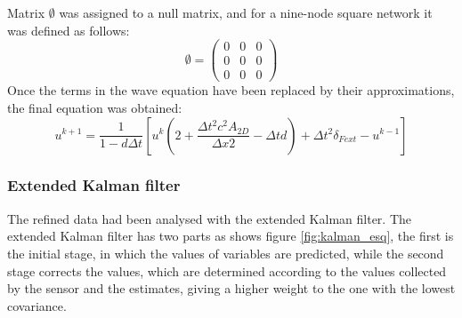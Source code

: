 \documentclass[12pt, a4paper]{article} %
\begin{document}
Matrix $\emptyset$ was assigned to a null matrix, and for a nine-node square network it was defined as follows:
\begin{equation} \label{eqn:matrixI}
    \emptyset = 
        \begin{pmatrix}
            0 & 0 & 0\\
            0 & 0 & 0\\
            0 & 0 & 0
    \end{pmatrix}
\end{equation}
Once the terms in the wave equation have been replaced by their approximations, the final equation was obtained:
\begin{equation} \label{eqn:uk+1}
   u^{k + 1} = \frac{1}{1 - d\Delta t} \left[u^{k} \left(2+ \frac{\Delta t^{2} c^{2} A_{2D}}{\Delta x{2}} - \Delta t d\right) + \Delta t^{2} \delta_{Fext} - u^{k - 1}\right]
\end{equation}
\setlength{\parskip}{0mm}
\subsubsection{Extended Kalman filter}

The refined data had been analysed with the extended Kalman filter. The extended Kalman filter has two parts as shows figure \ref{fig:kalman_esq}, the first is the initial stage, in which the values of variables are predicted, while the second stage corrects the values, which are determined according to the values collected by the sensor and the estimates, giving a higher weight to the one with the lowest covariance. 
\end{document}
